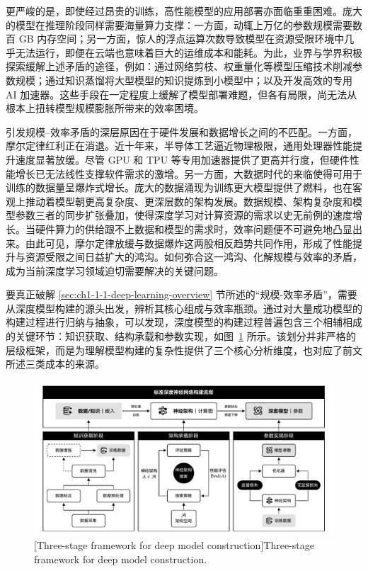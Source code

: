 \documentclass[../main.tex]{subfiles}
\begin{document}
更严峻的是，即使经过昂贵的训练，高性能模型的应用部署亦面临重重困难。庞大的模型在推理阶段同样需要海量算力支撑：一方面，动辄上万亿的参数规模需要数百 GB 内存空间；另一方面，惊人的浮点运算次数导致模型在资源受限环境中几乎无法运行，即便在云端也意味着巨大的运维成本和能耗。为此，业界与学界积极探索缓解上述矛盾的途径，例如：通过网络剪枝、权重量化等模型压缩技术削减参数规模\cite{deepcompressioncompressing_han_2016,quantizationtrainingneural_jacob_2018}；通过知识蒸馏将大型模型的知识提炼到小模型中\cite{distillingknowledgeneural_hinton_2015}；以及开发高效的专用 AI 加速器\cite{datacenterperformanceanalysis_jouppi_2017}。这些手段在一定程度上缓解了模型部署难题，但各有局限，尚无法从根本上扭转模型规模膨胀所带来的效率困境。

引发规模–效率矛盾的深层原因在于硬件发展和数据增长之间的不匹配。一方面，摩尔定律红利正在消退\cite{chipsaremoores_waldrop_2016}。近十年来，半导体工艺逼近物理极限，通用处理器性能提升速度显著放缓。尽管 GPU 和 TPU 等专用加速器提供了更高并行度，但硬件性能增长已无法线性支撑软件需求的激增。另一方面，大数据时代的来临使得可用于训练的数据量呈爆炸式增长。庞大的数据涌现为训练更大模型提供了燃料，也在客观上推动着模型朝更高复杂度、更深层数的架构发展。数据规模、架构复杂度和模型参数三者的同步扩张叠加，使得深度学习对计算资源的需求以史无前例的速度增长。当硬件算力的供给跟不上数据和模型的需求时，效率问题便不可避免地凸显出来。由此可见，摩尔定律放缓与数据爆炸这两股相反趋势共同作用，形成了性能提升与资源受限之间日益扩大的鸿沟。如何弥合这一鸿沟、化解规模与效率的矛盾，成为当前深度学习领域迫切需要解决的关键问题。

\label{sec:ch1-1-2-deep-model-mechanisms-and-key-steps}

要真正破解 \ref{sec:ch1-1-1-deep-learning-overview} 节所述的“规模-效率矛盾”，需要从深度模型构建的源头出发，辨析其核心组成与效率瓶颈。通过对大量成功模型的构建过程进行归纳与抽象，可以发现，深度模型的构建过程普遍包含三个相辅相成的关键环节：知识获取、结构承载和参数实现，如图~\ref{fig:three_stage_of_training} 所示。该划分并非严格的层级框架，而是为理解模型构建的复杂性提供了三个核心分析维度，也对应了前文所述三类成本的来源。

\begin{figure}
	\centering
	\includegraphics[width=\textwidth]{Ch1-1_three_stage_of_training.pdf}
	[Three-stage framework for deep model construction]{Three-stage framework for deep model construction.}
	\label{fig:three_stage_of_training}
\end{figure}
\end{document}
